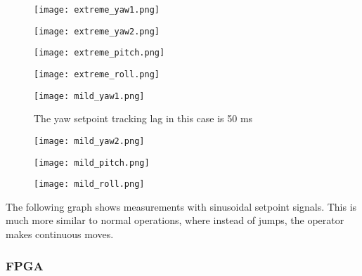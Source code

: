 

\begin{figure}[h] \label{ fig7} \begin{minipage}[b]{0.50\linewidth}\centering\texttt{[image: extreme\_yaw1.png]} \caption{} \end{minipage} \begin{minipage}[b]{0.50\linewidth}\centering\texttt{[image: extreme\_yaw2.png]} \caption{} \end{minipage} \begin{minipage}[b]{0.50\linewidth}\centering\texttt{[image: extreme\_pitch.png]} \caption{} \end{minipage}\hfill \begin{minipage}[b]{0.50\linewidth}\centering\texttt{[image: extreme\_roll.png]} \caption{} \end{minipage} \end{figure}

\begin{figure}[h] \label{ fig7} \begin{minipage}[b]{0.50\linewidth}\centering\texttt{[image: mild\_yaw1.png]} \caption{The yaw setpoint tracking lag in this case is 50 ms} \end{minipage} \begin{minipage}[b]{0.50\linewidth}\centering\texttt{[image: mild\_yaw2.png]} \caption{} \end{minipage} \begin{minipage}[b]{0.50\linewidth}\centering\texttt{[image: mild\_pitch.png]} \caption{} \end{minipage}\hfill \begin{minipage}[b]{0.50\linewidth}\centering\texttt{[image: mild\_roll.png]} \caption{} \end{minipage} \end{figure}


The following graph shows measurements with sinusoidal setpoint signals. This is much more similar to normal operations, where instead of jumps, the operator makes continuous moves.



\subsubsection{FPGA}

